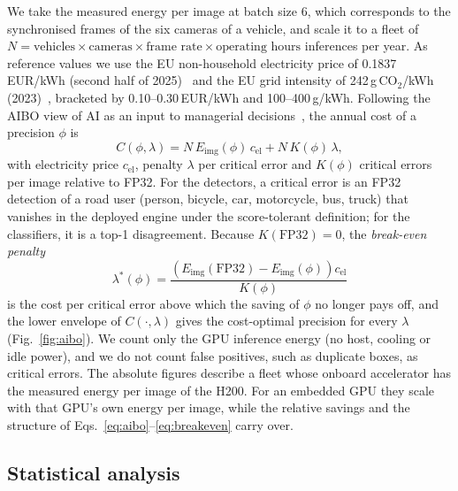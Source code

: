 \documentclass[pdflatex,sn-mathphys-num]{sn-jnl}%
\theoremstyle{thmstyleone}%
\theoremstyle{thmstyletwo}%
\theoremstyle{thmstylethree}%
\begin{document}
We take the measured energy per image at batch size 6, which corresponds to the synchronised frames of the six cameras of a vehicle, and scale it to a fleet of $N=\text{vehicles}\times\text{cameras}\times\text{frame rate}\times\text{operating hours}$ inferences per year. As reference values we use the EU non-household electricity price of 0.1837\,EUR/kWh (second half of 2025)~\cite{eurostat2026prices} and the EU grid intensity of 242\,g\,CO$_2$/kWh (2023)~\cite{ember2024eer}, bracketed by 0.10--0.30\,EUR/kWh and 100--400\,g/kWh. Following the AIBO view of AI as an input to managerial decisions~\cite{duan2019decision}, the annual cost of a precision $\phi$ is
\begin{equation}
C(\phi,\lambda) = N\,E_\mathrm{img}(\phi)\,c_\mathrm{el} + N\,K(\phi)\,\lambda,\label{eq:aibo}
\end{equation}
with electricity price $c_\mathrm{el}$, penalty $\lambda$ per critical error and $K(\phi)$ critical errors per image relative to FP32. For the detectors, a critical error is an FP32 detection of a road user (person, bicycle, car, motorcycle, bus, truck) that vanishes in the deployed engine under the score-tolerant definition; for the classifiers, it is a top-1 disagreement. Because $K(\mathrm{FP32})=0$, the \emph{break-even penalty}
\begin{equation}
\lambda^*(\phi) = \frac{\left(E_\mathrm{img}(\mathrm{FP32})-E_\mathrm{img}(\phi)\right)c_\mathrm{el}}{K(\phi)}\label{eq:breakeven}
\end{equation}
is the cost per critical error above which the saving of $\phi$ no longer pays off, and the lower envelope of $C(\cdot,\lambda)$ gives the cost-optimal precision for every $\lambda$ (Fig.~\ref{fig:aibo}). We count only the GPU inference energy (no host, cooling or idle power), and we do not count false positives, such as duplicate boxes, as critical errors. The absolute figures describe a fleet whose onboard accelerator has the measured energy per image of the H200. For an embedded GPU they scale with that GPU's own energy per image, while the relative savings and the structure of Eqs.~\eqref{eq:aibo}--\eqref{eq:breakeven} carry over.

\subsection{Statistical analysis}\label{sec:stats}
\end{document}
